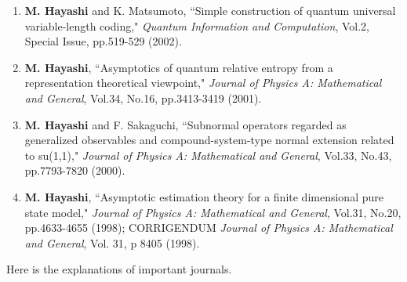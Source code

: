 \documentclass[a4paper,12pt,oneside]{article}
\begin{document}
\begin{enumerate}
\item
\textbf{M. Hayashi} and K. Matsumoto, ``Simple construction of quantum universal variable-length coding," 
{\em Quantum Information and Computation}, Vol.2, Special Issue, pp.519-529 (2002).

\item
\textbf{M. Hayashi}, ``Asymptotics of quantum relative entropy from a representation theoretical viewpoint," 
{\em Journal of Physics A: Mathematical and General}, Vol.34, No.16, pp.3413-3419 (2001).

\item
\textbf{M. Hayashi} and F. Sakaguchi, ``Subnormal operators regarded as generalized observables and compound-system-type normal extension related to su(1,1)," 
{\em Journal of Physics A: Mathematical and General}, Vol.33, No.43, pp.7793-7820 (2000).

\item
\textbf{M. Hayashi}, ``Asymptotic estimation theory for a finite dimensional pure state model," 
{\em Journal of Physics A: Mathematical and General}, Vol.31, No.20, pp.4633-4655 (1998); 
CORRIGENDUM {\em Journal of Physics A: Mathematical and General}, Vol. 31, p 8405 (1998).
\end{enumerate}


Here is the explanations of important journals.
\end{document}
